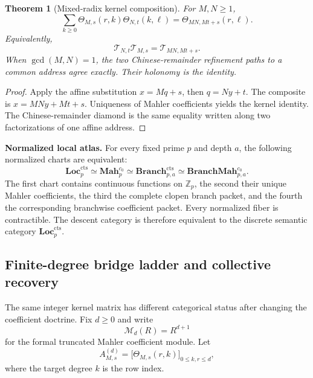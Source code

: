 \documentclass[11pt]{article}
\newtheorem{theorem}{Theorem}[section]
\theoremstyle{definition}
\theoremstyle{remark}
\begin{document}
\begin{theorem}[Mixed-radix kernel composition]
\label{thm:block08-kernel-composition}
For \(M,N\geq1\),
\[
 \boxed{
 \sum_{k\geq0}
 \Theta_{M,s}(r,k)\Theta_{N,t}(k,\ell)
 =
 \Theta_{MN,Mt+s}(r,\ell).}
\]
Equivalently,
\[
 \boxed{
 \mathcal T_{N,t}\mathcal T_{M,s}
 =
 \mathcal T_{MN,Mt+s}.}
\]
When \(\gcd(M,N)=1\), the two Chinese-remainder refinement paths to a common address agree exactly.  Their holonomy is the identity.
\end{theorem}

\begin{proof}
Apply the affine substitution \(x=Mq+s\), then \(q=Ny+t\).  The composite is \(x=MNy+Mt+s\).  Uniqueness of Mahler coefficients yields the kernel identity.  The Chinese-remainder diamond is the same equality written along two factorizations of one affine address.
\end{proof}

\begin{resultbox}
\textbf{Normalized local atlas.}
For every fixed prime \(p\) and depth \(a\), the following normalized charts are equivalent:
\[
 \boxed{
 \mathbf{Loc}^{\mathrm{cts}}_p
 \simeq
 \mathbf{Mah}^{c_0}_p
 \simeq
 \mathbf{Branch}^{\mathrm{cts}}_{p,a}
 \simeq
 \mathbf{BranchMah}^{c_0}_{p,a}.}
\]
The first chart contains continuous functions on \(\mathbb Z_p\), the second their unique Mahler coefficients, the third the complete clopen branch packet, and the fourth the corresponding branchwise coefficient packet.  Every normalized fiber is contractible.  The descent category is therefore equivalent to the discrete semantic category \(\mathbf{Loc}^{\mathrm{cts}}_p\).
\end{resultbox}

\subsection{Finite-degree bridge ladder and collective recovery}
\label{subsec:block08-finite-degree}

The same integer kernel matrix has different categorical status after changing the coefficient doctrine.  Fix \(d\geq0\) and write
\[
 \mathcal M_d(R)=R^{d+1}
\]
for the formal truncated Mahler coefficient module.  Let
\[
 A_{M,s}^{(d)}
 =\bigl[\Theta_{M,s}(r,k)\bigr]_{0\leq k,r\leq d},
\]
where the target degree \(k\) is the row index.
\end{document}

